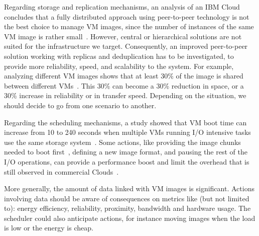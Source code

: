 Regarding storage and replication mechanisms,  an analysis of an IBM Cloud concludes
that a fully distributed approach using peer-to-peer technology is not the best choice to manage VM images, since the
number of instances of the same VM image is rather small~\cite{peng:2012}. However, central or
hierarchical solutions are not suited for the infrastructure we target.
Consequently, an improved peer-to-peer solution working with replicas and
deduplication has to be investigated, to provide more
reliability, speed, and scalability to the system. For example, analyzing
different VM images shows that at least 30\% of the image is shared between
different VMs~\cite{jin:systor2009}. This 30\% can become a 30\% reduction in space, or a
30\% increase in reliability or in transfer speed. Depending on the
situation, we should decide to go from one scenario to another. 

Regarding the scheduling mechanisms, a study showed that VM boot time can increase
from 10 to 240 seconds when multiple VMs running I/O intensive tasks use the
same storage system~\cite{tan:2008}. Some actions, like providing the
image chunks needed to boot first~\cite{tang:2011}, defining a new
image format, and pausing the rest of the I/O operations, can provide a
performance boost and limit the overhead that is still observed in commercial
Clouds~\cite{mao:2012}. 

More generally, the amount of data linked with VM images is significant.
Actions involving data  should be aware of consequences on metrics like
(but not limited to): energy efficiency, reliability, proximity, bandwidth and
hardware usage. The scheduler could also anticipate actions, for instance moving images when
the load is low or the energy is cheap.

